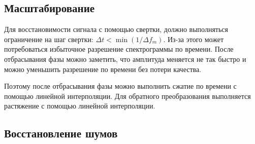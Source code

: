 \subsection{Масштабирование}
Для восстановимости сигнала с помощью свертки, должно выполняться ограничение на шаг свертки: $\Delta t < \min(1 / \Delta f_m)$.
Из-за этого может потребоваться избыточное разрешение спектрограммы по времени. 
После отбрасывания фазы можно заметить, что амплитуда меняется не так быстро и можно уменьшить разрешение по времени без потери качества.

Поэтому после отбрасывания фазы можно выполнить сжатие по времени с помощью линейной интерполяции.
Для обратного преобразования выполняется растяжение с помощью линейной интерполяции.


\subsection{Восстановление шумов}

